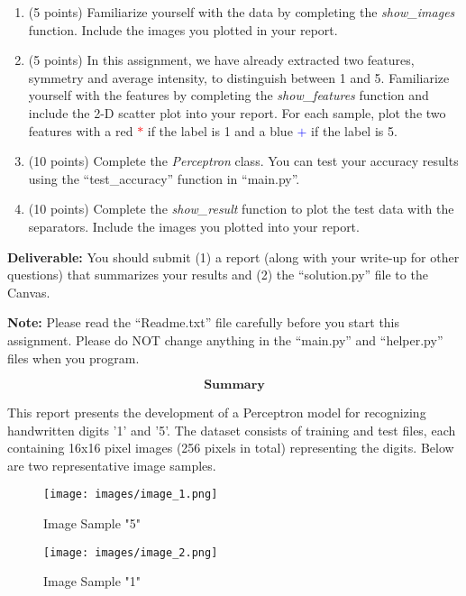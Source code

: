 \documentclass[11pt]{article}
\begin{document}
\begin{enumerate}
\begin{enumerate}
\item (5 points) Familiarize yourself with the data by completing the \emph{show\_images} function. Include the images you plotted in your report.
\item (5 points) In this assignment, we have already extracted two features, symmetry and
average intensity, to distinguish between 1 and 5. Familiarize
yourself with the features by completing the \emph{show\_features}
function and include the 2-D scatter plot into your report. For each
sample, plot the two features with a red \textcolor{red}{$*$} if the
label is 1 and a blue \textcolor{blue}{$+$}  if the label is 5.
\item (10 points) Complete the \emph{Perceptron} class. You can test your
accuracy results using the ``test\_accuracy'' function in
``main.py''.
\item (10 points) Complete the \emph{show\_result} function to plot the
test data with the separators. Include the images you plotted into your report.
\end{enumerate}

\textbf{Deliverable:} You should submit (1) a report
(along with your write-up for other questions) that summarizes your
results and (2) the ``solution.py'' file to the Canvas.

\textbf{Note:} Please read the ``Readme.txt'' file carefully before
you start this assignment. Please do {\color{red} NOT} change anything in the
``main.py'' and ``helper.py'' files when you program.

\end{enumerate}

\[\textbf{Summary}\]

This report presents the development of a Perceptron model for recognizing handwritten digits '1' and '5'. The dataset consists of training and test files, each containing 16x16 pixel images (256 pixels in total) representing the digits. Below are two representative image samples.

\begin{minipage}{0.45\textwidth}
    \begin{figure}[H]
    \centering
    \texttt{[image: images/image\_1.png]}
    \caption{Image Sample "5"}
    \label{fig:enter-label}
\end{figure}
\end{minipage}
\begin{minipage}{0.45\textwidth}
    \begin{figure}[H]
    \centering
    \texttt{[image: images/image\_2.png]}
    \caption{Image Sample "1"}
    \label{fig:enter-label}
\end{figure}
\end{minipage}\\
\end{document}
